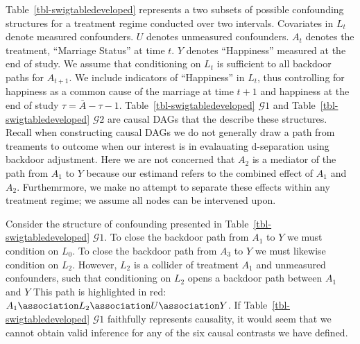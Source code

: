 \documentclass[
  single column]{article}
\begin{document}
Table~\ref{tbl-swigtabledeveloped} represents a two subsets of possible
confounding structures for a treatment regime conducted over two
intervals. Covariates in \(L_{t}\) denote measured confounders. \(U\)
denotes unmeasured confounders. \(A_t\) denotes the treatment,
``Marriage Status'' at time \(t\). \(Y\) denotes ``Happiness'' measured
at the end of study. We assume that conditioning on \(L_{t}\) is
sufficient to all backdoor paths for \(A_{t+1}\). We include indicators
of ``Happiness'' in \(L_{t}\), thus controlling for happiness as a
common cause of the marriage at time \(t+1\) and happiness at the end of
study \(\tau = \bar{A}-{\tau -1}\). Table~\ref{tbl-swigtabledeveloped}
\(\mathcal{G}1\) and Table~\ref{tbl-swigtabledeveloped} \(\mathcal{G}2\)
are causal DAGs that the describe these structures. Recall when
constructing causal DAGs we do not generally draw a path from treaments
to outcome when our interest is in evalauating d-separation using
backdoor adjustment. Here we are not concerned that \(A_2\) is a
mediator of the path from \(A_1\) to \(Y\) because our estimand refers
to the combined effect of \(A_1\) and \(A_2\). Furthemrmore, we make no
attempt to separate these effects within any treatment regime; we assume
all nodes can be intervened upon.

Consider the structure of confounding presented in
Table~\ref{tbl-swigtabledeveloped} \(\mathcal{G}1\). To close the
backdoor path from \(A_1\) to \(Y\) we must condition on \(L_0\). To
close the backdoor path from \(A_3\) to \(Y\) we must likewise condition
on \(L_2\). However, \(L_2\) is a collider of treatment \(A_1\) and
unmeasured confounders, such that conditioning on \(L_2\) opens a
backdoor path between \(A_1\) and \(Y\) This path is highlighted in red:
\(A_1 \association L_2 \association U \association Y\). If
Table~\ref{tbl-swigtabledeveloped} \(\mathcal{G}1\) faithfully
represents causality, it would seem that we cannot obtain valid
inference for any of the six causal contrasts we have defined.
\end{document}
